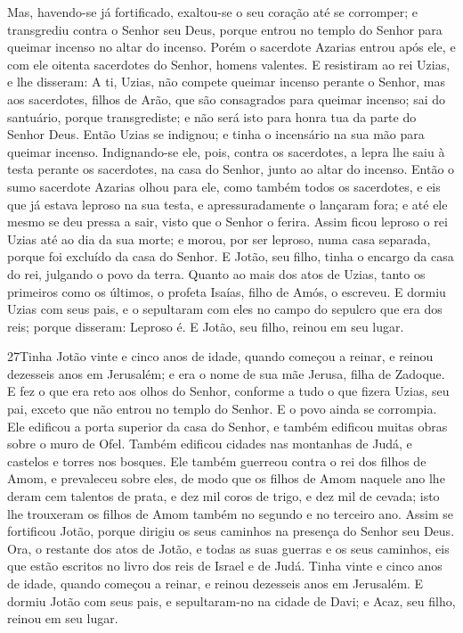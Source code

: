 Mas, havendo-se já fortificado, exaltou-se o seu coração até se
corromper; e transgrediu contra o Senhor seu Deus, porque entrou no
templo do Senhor para queimar incenso no altar do incenso.
Porém o sacerdote Azarias entrou após ele, e com ele oitenta
sacerdotes do Senhor, homens valentes. E resistiram ao rei
Uzias, e lhe disseram: A ti, Uzias, não compete queimar incenso
perante o Senhor, mas aos sacerdotes, filhos de Arão, que são
consagrados para queimar incenso; sai do santuário, porque
transgrediste; e não será isto para honra tua da parte do Senhor
Deus. Então Uzias se indignou; e tinha o incensário na sua
mão para queimar incenso. Indignando-se ele, pois, contra os
sacerdotes, a lepra lhe saiu à testa perante os sacerdotes, na casa
do Senhor, junto ao altar do incenso. Então o sumo sacerdote
Azarias olhou para ele, como também todos os sacerdotes, e eis que
já estava leproso na sua testa, e apressuradamente o lançaram fora;
e até ele mesmo se deu pressa a sair, visto que o Senhor o ferira.
Assim ficou leproso o rei Uzias até ao dia da sua morte; e
morou, por ser leproso, numa casa separada, porque foi excluído da
casa do Senhor. E Jotão, seu filho, tinha o encargo da casa do rei,
julgando o povo da terra. Quanto ao mais dos atos de Uzias,
tanto os primeiros como os últimos, o profeta Isaías, filho de Amós,
o escreveu. E dormiu Uzias com seus pais, e o sepultaram com
eles no campo do sepulcro que era dos reis; porque disseram: Leproso
é. E Jotão, seu filho, reinou em seu lugar.

\medskip

\lettrine{27} Tinha Jotão vinte e cinco anos de idade, quando
começou a reinar, e reinou dezesseis anos em Jerusalém; e era o nome
de sua mãe Jerusa, filha de Zadoque. E fez o que era reto aos
olhos do Senhor, conforme a tudo o que fizera Uzias, seu pai, exceto
que não entrou no templo do Senhor. E o povo ainda se corrompia.
Ele edificou a porta superior da casa do Senhor, e também
edificou muitas obras sobre o muro de Ofel. Também edificou
cidades nas montanhas de Judá, e castelos e torres nos bosques.
Ele também guerreou contra o rei dos filhos de Amom, e
prevaleceu sobre eles, de modo que os filhos de Amom naquele ano lhe
deram cem talentos de prata, e dez mil coros de trigo, e dez mil de
cevada; isto lhe trouxeram os filhos de Amom também no segundo e no
terceiro ano. Assim se fortificou Jotão, porque dirigiu os seus
caminhos na presença do Senhor seu Deus. Ora, o restante dos
atos de Jotão, e todas as suas guerras e os seus caminhos, eis que
estão escritos no livro dos reis de Israel e de Judá. Tinha
vinte e cinco anos de idade, quando começou a reinar, e reinou
dezesseis anos em Jerusalém. E dormiu Jotão com seus pais, e
sepultaram-no na cidade de Davi; e Acaz, seu filho, reinou em seu
lugar.

